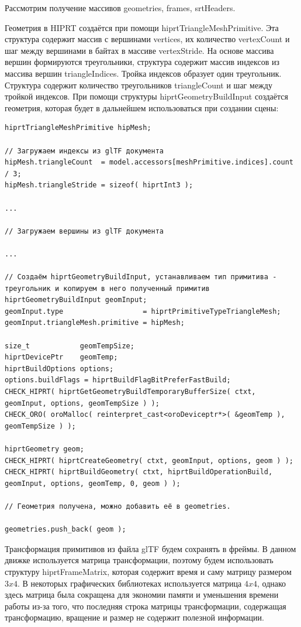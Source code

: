 \documentclass[a4paper,14pt]{extarticle}
\begin{document}
Рассмотрим получение массивов geometries, frames, srtHeaders. 

Геометрия в HIPRT создаётся при помощи hiprtTriangleMeshPrimitive. Эта структура содержит массив с вершинами vertices, 
их количество vertexCount и шаг между вершинами в байтах в массиве vertexStride.
На основе массива вершин формируются треугольники, структура содержит массив индексов из массива вершин triangleIndices. 
Тройка индексов образует один треугольник. Структура содержит количество треугольников
triangleCount и шаг между тройкой индексов. При помощи структуры hiprtGeometryBuildInput создаётся геометрия, которая будет
в дальнейшем использоваться при создании сцены:
\begin{verbatim}
hiprtTriangleMeshPrimitive hipMesh;

// Загружаем индексы из glTF документа
hipMesh.triangleCount  = model.accessors[meshPrimitive.indices].count / 3;
hipMesh.triangleStride = sizeof( hiprtInt3 );

...

// Загружаем вершины из glTF документа

...

// Создаём hiprtGeometryBuildInput, устанавливаем тип примитива - треугольник и копируем в него полученный примитив
hiprtGeometryBuildInput geomInput;
geomInput.type					 = hiprtPrimitiveTypeTriangleMesh;
geomInput.triangleMesh.primitive = hipMesh;

size_t			  geomTempSize;
hiprtDevicePtr	  geomTemp;
hiprtBuildOptions options;
options.buildFlags = hiprtBuildFlagBitPreferFastBuild;
CHECK_HIPRT( hiprtGetGeometryBuildTemporaryBufferSize( ctxt, geomInput, options, geomTempSize ) );
CHECK_ORO( oroMalloc( reinterpret_cast<oroDeviceptr*>( &geomTemp ), geomTempSize ) );

hiprtGeometry geom;
CHECK_HIPRT( hiprtCreateGeometry( ctxt, geomInput, options, geom ) );
CHECK_HIPRT( hiprtBuildGeometry( ctxt, hiprtBuildOperationBuild, geomInput, options, geomTemp, 0, geom ) );

// Геометрия получена, можно добавить её в geometries.

geometries.push_back( geom );
\end{verbatim}

Трансформация примитивов из файла glTF будем сохранять в фреймы. В данном движке используется матрица трансформации, поэтому будем использовать 
структуру hiprtFrameMatrix, которая содержит время и саму матрицу размером $3 x 4$. В некоторых графических библиотеках используется матрица 
$4 x 4$, однако здесь матрица была сокращена для экономии памяти и уменьшения времени работы из-за того, что последняя строка матрицы трансформации,
содержащая трансформацию, вращение и размер не содержит полезной информации.
\end{document}

